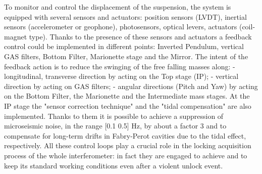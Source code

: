 To monitor and control the displacement of the suspension, the system is equipped with several sensors and actuators: position sensors (LVDT), inertial sensors (accelerometer or geophone), photosensors, optical levers, actuators (coil-magnet type). Thanks to the presence of these sensors and actuators a feedback control could be implemented in different points: Inverted Pendulum, vertical GAS filters, Bottom Filter, Marionette stage and the Mirror.
The intent of the feedback action is to reduce the swinging of the free falling masses along:
-longitudinal, transverse direction by acting on the Top stage (IP);
- vertical direction by acting on GAS filters;
- angular directions (Pitch and Yaw) by acting on the Bottom Filter, the Marionette and the Intermediate mass stages.
At the IP stage the "sensor correction technique" and the "tidal compensation" are also implemented. Thanks to them it is possible to achieve a suppression of microseismic noise, in the range [0.1 0.5] Hz, by about a factor 3 and to compensate for long-term drifts in Fabry-Perot cavities due to the tidal effect, respectively.
All these control loops play a crucial role in the locking acquisition process of the whole interferometer: in fact they are engaged to achieve and to keep its standard working conditions even after a violent unlock event.














